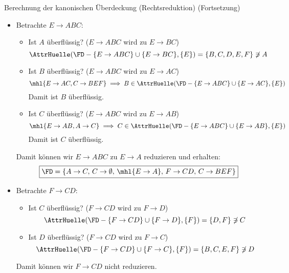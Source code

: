\begin{example}{Berechnung der kanonischen Überdeckung (Rechtsreduktion) (Fortsetzung)}
    \begin{itemize}
        \item Betrachte $E \to ABC$:
              \begin{itemize}
                  \item Ist $A$ überflüssig? ($E \to ABC$ wird zu $E \to BC$)
                        \[
                            \AttrHuelle(\FD - \{ E \to ABC \} \cup \{ E \to BC \}, \{E\}) = \{ B, C, D, E, F \} \not\ni A
                        \]
                  \item Ist $B$ überflüssig? ($E \to ABC$ wird zu $E \to AC$)
                        \[
                            \mhl{E \to AC, C \to BEF} \implies B \in \AttrHuelle(\FD - \{ E \to ABC \} \cup \{ E \to AC \}, \{E\})
                        \]
                        Damit ist $B$ überflüssig.
                  \item Ist $C$ überflüssig? ($E \to ABC$ wird zu $E \to AB$)
                        \[
                            \mhl{E \to AB, A \to C} \implies C \in \AttrHuelle(\FD - \{ E \to ABC \} \cup \{ E \to AB \}, \{E\})
                        \]
                        Damit ist $C$ überflüssig.
              \end{itemize}
              Damit können wir $E \to ABC$ zu $E \to A$ reduzieren und erhalten:
              \[
                  \boxed{
                      \FD = \{
                      A \to C, \,
                      C \to \emptyset, \,
                      \mhl{E \to A}, \,
                      F \to CD, \,
                      C \to BEF
                      \}
                  }
              \]

        \item Betrachte $F \to CD$:
              \begin{itemize}
                  \item Ist $C$ überflüssig? ($F \to CD$ wird zu $F \to D$)
                        \[
                            \AttrHuelle(\FD - \{ F \to CD \} \cup \{ F \to D \}, \{F\}) = \{ D, F \} \not\ni C
                        \]
                  \item Ist $D$ überflüssig? ($F \to CD$ wird zu $F \to C$)
                        \[
                            \AttrHuelle(\FD - \{ F \to CD \} \cup \{ F \to C \}, \{F\}) = \{ B, C, E, F \} \not\ni D
                        \]
              \end{itemize}
              Damit können wir $F \to CD$ nicht reduzieren.


\end{itemize}
\end{example}
